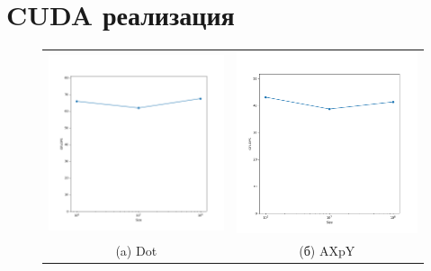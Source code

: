 \documentclass[12pt, a4paper]{article}
\begin{document}
\section{CUDA реализация}

\begin{figure}[H]
	\center
	\begin{tabular}{cc}
		\includegraphics[width=85mm]{2025/cuda_dot} & \includegraphics[width=85mm]{2025/cuda_axpy} \\
		(a) Dot & (б) AXpY \\

\end{tabular}
\end{figure}
\end{document}
